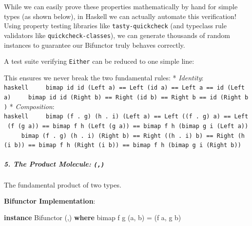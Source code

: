 \documentclass[
]{article}
\newenvironment{Shaded}{}{}
\newcommand{\CommentTok}[1]{\textcolor[rgb]{0.38,0.63,0.69}{\textit{#1}}}
\newcommand{\DataTypeTok}[1]{\textcolor[rgb]{0.56,0.13,0.00}{#1}}
\newcommand{\KeywordTok}[1]{\textcolor[rgb]{0.00,0.44,0.13}{\textbf{#1}}}
\newcommand{\NormalTok}[1]{#1}
\newcommand{\OperatorTok}[1]{\textcolor[rgb]{0.40,0.40,0.40}{#1}}
\newcommand{\OtherTok}[1]{\textcolor[rgb]{0.00,0.44,0.13}{#1}}
\newcommand{\StringTok}[1]{\textcolor[rgb]{0.25,0.44,0.63}{#1}}
\begin{document}
While we can easily prove these properties mathematically by hand for
simple types (as shown below), in Haskell we can actually automate this
verification! Using property testing libraries like
\texttt{tasty-quickcheck} (and typeclass rule validators like
\texttt{quickcheck-classes}), we can generate thousands of random
instances to guarantee our Bifunctor truly behaves correctly.

A test suite verifying \texttt{Either} can be reduced to one simple
line:

\begin{Shaded}
\end{Shaded}

This ensures we never break the two fundamental rules: *
\emph{Identity}:
\texttt{haskell\ \ \ \ \ bimap\ id\ id\ (Left\ a)\ ==\ Left\ (id\ a)\ ==\ Left\ a\ ==\ id\ (Left\ a)\ \ \ \ \ bimap\ id\ id\ (Right\ b)\ ==\ Right\ (id\ b)\ ==\ Right\ b\ ==\ id\ (Right\ b)}
* \emph{Composition}:
\texttt{haskell\ \ \ \ \ bimap\ (f\ .\ g)\ (h\ .\ i)\ (Left\ a)\ ==\ Left\ ((f\ .\ g)\ a)\ ==\ Left\ (f\ (g\ a))\ ==\ bimap\ f\ h\ (Left\ (g\ a))\ ==\ bimap\ f\ h\ (bimap\ g\ i\ (Left\ a))\ \ \ \ \ bimap\ (f\ .\ g)\ (h\ .\ i)\ (Right\ b)\ ==\ Right\ ((h\ .\ i)\ b)\ ==\ Right\ (h\ (i\ b))\ ==\ bimap\ f\ h\ (Right\ (i\ b))\ ==\ bimap\ f\ h\ (bimap\ g\ i\ (Right\ b))}

\subparagraph{\texorpdfstring{5. The Product Molecule:
\texttt{(,)}}{5. The Product Molecule: (,)}}\label{the-product-molecule}

The fundamental product of two types.

\textbf{Bifunctor Implementation}:

\begin{Shaded}
\begin{Highlighting}[]
\KeywordTok{instance} \DataTypeTok{Bifunctor}\NormalTok{ (,) }\KeywordTok{where}
\NormalTok{    bimap f g (a, b) }\OtherTok{=}\NormalTok{ (f a, g b)}
\end{Highlighting}
\end{Shaded}
\end{document}
